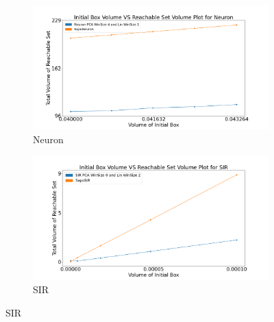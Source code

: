 \begin{figure}[h!]
    \hspace{-1.5em}
    \begin{subfigure}{0.5\textwidth}
    \centering
    \includegraphics[width=1.1\textwidth, height=0.75\textwidth]{figures/InitVolVSReachVol/NeuronInitReachVol200steps.png}
    \caption{Neuron}
    \end{subfigure}%
    \begin{subfigure}{0.5\textwidth}
    \centering
    \includegraphics[width=1.1\textwidth, height=0.75\textwidth]{figures/InitVolVSReachVol/SIRInitReachVol.png}
    \caption{SIR}
    \end{subfigure}


\end{figure}
